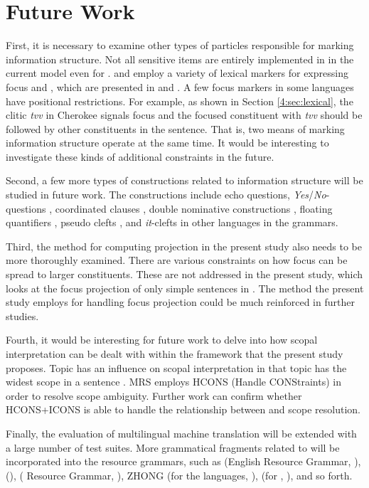 \section{Future Work}
\label{15:sec:future}



First, it is necessary to examine other types of particles responsible
for marking information structure.  Not all  sensitive
items are entirely implemented in  in the current model even
for .  and 
employ a variety of lexical markers for expressing focus and
, which are presented in \citet{hasegawa:11} and
\citet{lee:04}. A few focus markers in some languages have positional
restrictions. For example, as shown in Section \ref{4:sec:lexical},
the clitic \textit{tvv} in Cherokee signals focus and the focused
constituent with \textit{tvv} should be followed by other constituents
in the sentence. That is, two means of marking information structure
operate at the same time.  It would be interesting to investigate
these kinds of additional constraints in the future.


Second, a few more types of constructions related to information
structure will be studied in future work.  The constructions include
echo questions, \textit{Yes}/\textit{No}-questions \citep{king:95},
coordinated clauses \citep{heycock:07}, double nominative
constructions \citep{kim:sells:07,choi:12}, floating quantifiers
\citep{yoshimoto:etal:06,kim:11b}, pseudo clefts
\citep{kim:07}, and \textit{it}-clefts in other languages
in the  grammars.


Third, the method for computing 
projection in the present study also needs to be more thoroughly
examined. There are various constraints on how focus can be spread to
larger constituents. These are not addressed in the present study,
which looks at the focus projection of only simple sentences in
. The method the present study employs for handling focus
projection could be much reinforced in further studies.


Fourth, it would be interesting for future work to delve into how
scopal interpretation can be dealt with within the framework that the
present study proposes.  Topic has an influence on scopal
interpretation in that topic has the widest scope in a sentence
\citep{buring:97,portner:yabushita:98,erteschik:07}.  MRS employs
HCONS (Handle CONStraints) in order to resolve scope
ambiguity. Further work can confirm whether HCONS+ICONS is
able to handle the relationship between  and scope resolution.


Finally, the evaluation of multilingual machine translation will be
extended with a large number of test suites. More grammatical
fragments related to  will be incorporated into the
 resource grammars, such as  (English Resource
Grammar, \citealt{flickinger:00}), 
(\citealt{siegel:etal:16}),  ( Resource
Grammar, \citealt{kim:etal:11}), ZHONG  (for the
 languages, \citealt{fan:15a,fan:15b}),
 (for , \citealt{moeljadi:15}), and so
forth.

